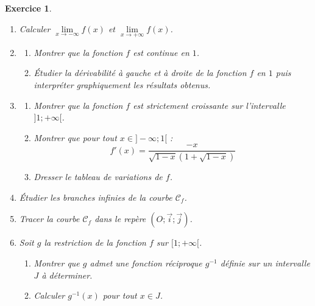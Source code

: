 \documentclass[12pt,a4paper]{article}
\theoremstyle{mystyle}
\newtheorem{exo}{Exercice}
\begin{document}
\begin{multicols*}{2}
\begin{exo}
\begin{enumerate}
    \item Calculer $\lim\limits_{x \to -\infty} f(x)$ et $\lim\limits_{x \to +\infty} f(x)$.
    \item 
    \begin{enumerate}
        \item Montrer que la fonction $f$ est continue en $1$.
        \item Étudier la dérivabilité à gauche et à droite de la fonction $f$ en $1$ puis interpréter graphiquement les résultats obtenus.
    \end{enumerate}
    \item 
    \begin{enumerate}
        \item Montrer que la fonction $f$ est strictement croissante sur l'intervalle $]1; +\infty[$.
        \item Montrer que pour tout $x \in ]-\infty; 1[$ :
        \[
        f'(x) = \frac{-x}{\sqrt{1 - x} \left( 1 + \sqrt{1 - x} \right)}
        \]
        \item Dresser le tableau de variations de $f$.
     \end{enumerate}
    \item Étudier les branches infinies de la courbe $\mathcal{C}_f$.
    \item Tracer la courbe $\mathcal{C}_f$ dans le repère $(O; \overrightarrow{i}; \overrightarrow{j})$.
    \item Soit $g$ la restriction de la fonction $f$ sur $[1; +\infty[$.
    \begin{enumerate}
        \item Montrer que $g$ admet une fonction réciproque $g^{-1}$ définie sur un intervalle $J$ à déterminer.
        \item Calculer $g^{-1}(x)$ pour tout $x \in J$.
    \end{enumerate}
\end{enumerate}

\end{exo}


\end{multicols*}
\end{document}
